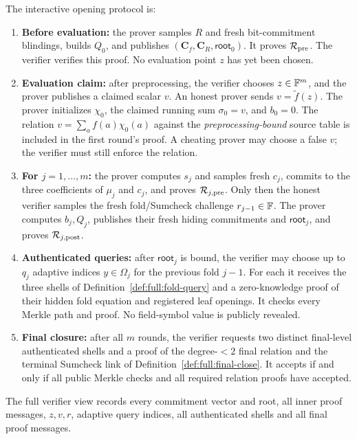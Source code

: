 \begin{definition}\label{def:full:protocol}
The interactive opening protocol is:

\begin{enumerate}[label=\textup{(\roman*)}]
\item \textbf{Before evaluation:}
the prover samples $R$ and fresh
bit-commitment blindings, builds
$Q_0$, and publishes
$(\mathbf C_f,\mathbf C_R,\mathsf{root}_0)$.
It proves $\mathcal R_{\rm pre}$.
The verifier verifies this proof.
No evaluation point $z$ has yet
been chosen.
\item \textbf{Evaluation claim:}
after preprocessing, the verifier
chooses $z\in\mathbb{F}^m$, and the
prover publishes a claimed scalar
$v$. An honest prover sends
$v=\widetilde f(z)$.
The prover initializes $\chi_0$,
the claimed running sum
$\sigma_0=v$, and $b_0=0$.
The relation
$v=\sum_a f(a)\chi_0(a)$
against the \emph{preprocessing-bound}
source table is included in the
first round's proof.
A cheating prover may choose
a false $v$; the verifier
must still enforce the relation.
\item \textbf{For $j=1,\ldots,m$:}
the prover computes $s_j$ and
samples fresh $c_j$, commits to
the three coefficients of $\mu_j$
and $c_j$, and proves
$\mathcal R_{j,\rm pre}$.
Only then the honest verifier
samples the fresh fold/Sumcheck
challenge $r_{j-1}\in\mathbb{F}$.
The prover computes $b_j,Q_j$,
publishes their fresh hiding
commitments and $\mathsf{root}_j$,
and proves $\mathcal R_{j,\rm post}$.
\item \textbf{Authenticated queries:}
after $\mathsf{root}_j$ is bound,
the verifier may choose up to
$q_j$ adaptive indices
$y\in\Omega_j$ for the previous
fold $j-1$. For each it receives
the three shells of
Definition~\ref{def:full:fold-query}
and a zero-knowledge proof of
their hidden fold equation and
registered leaf openings.
It checks every Merkle path
and proof. No field-symbol
value is publicly revealed.
\item \textbf{Final closure:}
after all $m$ rounds, the
verifier requests two distinct
final-level authenticated shells
and a proof of the
degree-$<2$ final relation and
the terminal Sumcheck link of
Definition~\ref{def:full:final-close}.
It accepts if and only if
all public Merkle checks and
all required relation proofs
have accepted.
\end{enumerate}
The full verifier view records
every commitment vector and root,
all inner proof messages,
$z,v,r$, adaptive query indices,
all authenticated shells and
all final proof messages.
\end{definition}

